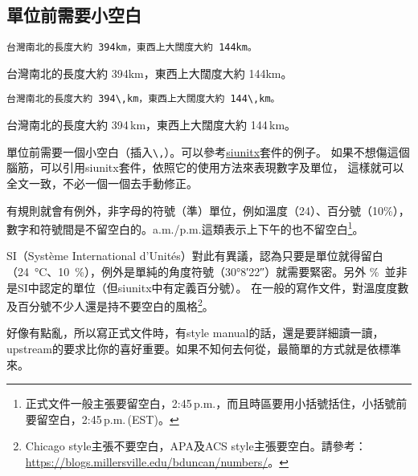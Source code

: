 \subsection{單位前需要小空白}
\label{sub:unit}

\begin{Wrong}
\begin{verbatim}
台灣南北的長度大約 394km，東西上大闊度大約 144km。
\end{verbatim}

台灣南北的長度大約 394km，東西上大闊度大約 144km。
\end{Wrong}

\begin{Right}
\begin{verbatim}
台灣南北的長度大約 394\,km，東西上大闊度大約 144\,km。
\end{verbatim}

台灣南北的長度大約 394\,km，東西上大闊度大約 144\,km。
\end{Right}

單位前需要一個小空白（插入\verb|\,|）。可以參考\href{https://github.com/josephwright/siunitx}{\sf siunitx}套件的例子。
如果不想傷這個腦筋，可以引用{\sf siunitx}套件，依照它的使用方法來表現數字及單位，
這樣就可以全文一致，不必一個一個去手動修正。

有規則就會有例外，非字母的符號（準）單位，例如溫度（24\textcelsius）、百分號（10\%），數字和符號間是不留空白的。a.m./p.m.\/這類表示上下午的也不留空白\footnote{正式文件一般主張要留空白，2:45\,p.m.，而且時區要用小括號括住，小括號前要留空白，2:45\,p.m.\,(EST)。}。

{\sf SI}（Système International d'Unités）對此有異議，認為只要是單位就得留白（\SI{24}{\degreeCelsius}、\SI{10}{\percent}），例外是單純的角度符號（\ang{30;8;22}）就需要緊密。另外 \%\ 並非是{\sf SI}中認定的單位（但{\sf siunitx}中有定義百分號）。
在一般的寫作文件，對溫度度數及百分號不少人還是持不要空白的風格\footnote{Chicago style主張不要空白，APA及ACS style主張要空白。請參考：\url{https://blogs.millersville.edu/bduncan/numbers/}。}。

好像有點亂，所以寫正式文件時，有style manual的話，還是要詳細讀一讀，upstream的要求比你的喜好重要。如果不知何去何從，最簡單的方式就是依標準來。
